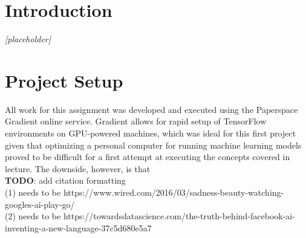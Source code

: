 \documentclass{article}
\begin{document}
  
  \graphicspath{{./hw1-images/}}
\section{Introduction}
\textit{[placeholder]}
\section{Project Setup}
All work for this assignment was developed and executed using the Paperspace Gradient online service.
Gradient allows for rapid setup of TensorFlow environments on GPU-powered machines, which was ideal for this first project given that optimizing a personal computer for running machine learning models proved to be difficult for a first attempt at executing the concepts covered in lecture. The downside, however, is that 
\\[0.5in]
\textbf{TODO}: add citation formatting
\\
(1) needs to be https://www.wired.com/2016/03/sadness-beauty-watching-googles-ai-play-go/
\\
(2) needs to be https://towardsdatascience.com/the-truth-behind-facebook-ai-inventing-a-new-language-37c5d680e5a7
\end{document}
